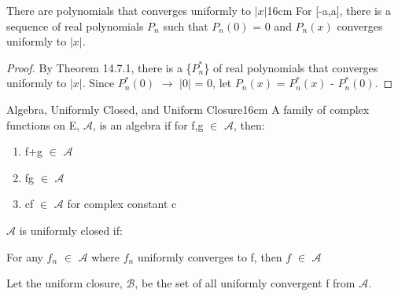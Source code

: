     \vspace{0.5cm}



    \begin{corollary}{There are polynomials that converges uniformly to $|x|$}{16cm}
        For [-a,a], there is a sequence of real polynomials $P_n$
        such that $P_n(0)$ = 0 and $P_n(x)$ converges uniformly to $|x|$. 
    \end{corollary}

    \begin{proof}
        By {\color{red} Theorem 14.7.1}, there is a \{$P_n^*$\}
        of real polynomials that converges uniformly to $|x|$.
        Since $P_n^*(0)$ $\rightarrow$ $|0|$ = 0, let
        $P_n(x)$ = $P_n^*(x)$ - $P_n^*(0)$.
    \end{proof}

    \vspace{0.5cm}



    \begin{definition}{Algebra, Uniformly Closed, and Uniform Closure}{16cm}
        A family of complex functions on E, $\mathscr{A}$, is
        an {\color{lblue} algebra} if for f,g $\in$ $\mathscr{A}$, then:

        \begin{enumerate}[label=(\alph*), leftmargin=1.5cm, itemsep=0.1cm]
            \item f+g $\in$ $\mathscr{A}$
            
            \item fg $\in$ $\mathscr{A}$
            
            \item cf $\in$ $\mathscr{A}$ for complex constant c 
        \end{enumerate}

        \vspace{0.3cm}

        $\mathscr{A}$ is {\color{lblue} uniformly closed} if:
        
        \hspace{0.5cm}
        For any $f_n$ $\in$ $\mathscr{A}$
        where $f_n$ uniformly converges to f, then $f$ $\in$ $\mathscr{A}$
        
        \vspace{0.3cm}

        Let the {\color{lblue} uniform closure}, $\mathscr{B}$, be the set of all
        uniformly convergent f from $\mathscr{A}$.
    \end{definition}

